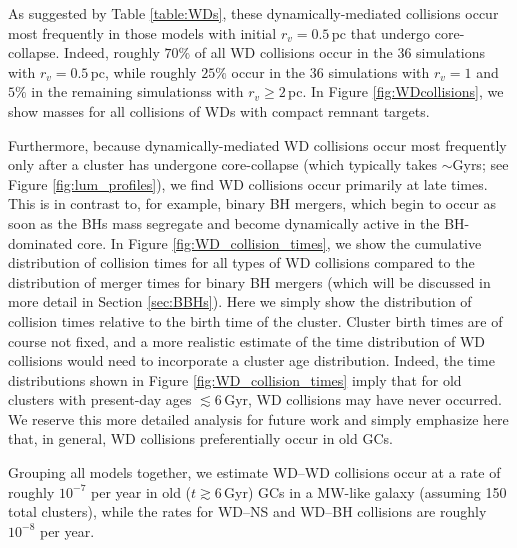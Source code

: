 \documentclass[twocolumn,tighten]{aastex63}
\begin{document}
As suggested by Table \ref{table:WDs}, these dynamically-mediated collisions occur most frequently in those models with initial $r_v=0.5\,$pc that undergo core-collapse. Indeed, roughly $70\%$ of all WD collisions occur in the 36 simulations with $r_v=0.5\,$pc, while roughly $25\%$ occur in the 36 simulations with $r_v=1$ and $5\%$ in the remaining simulationss with $r_v \geq 2\,$pc. In Figure \ref{fig:WDcollisions}, we show masses for all collisions of WDs with compact remnant targets.

Furthermore, because dynamically-mediated WD collisions occur most frequently only after a cluster has undergone core-collapse (which typically takes $\sim$Gyrs; see Figure \ref{fig:lum_profiles}), we find WD collisions occur primarily at late times. This is in contrast to, for example, binary BH mergers, which begin to occur as soon as the BHs mass segregate and become dynamically active in the BH-dominated core. In Figure \ref{fig:WD_collision_times}, we show the cumulative distribution of collision times for all types of WD collisions compared to the distribution of merger times for binary BH mergers (which will be discussed in more detail in Section \ref{sec:BBHs}). Here we simply show the distribution of collision times relative to the birth time of the cluster. Cluster birth times are of course not fixed, and a more realistic estimate of the time distribution of WD collisions would need to incorporate a cluster age distribution. Indeed, the time distributions shown in Figure \ref{fig:WD_collision_times} imply that for old clusters with present-day ages $\lesssim6\,$Gyr, WD collisions may have never occurred. We reserve this more detailed analysis for future work and simply emphasize here that, in general, WD collisions preferentially occur in old GCs.

Grouping all models together, we estimate WD--WD collisions occur at a rate of roughly $10^{-7}$ per year in old ($t\gtrsim6\,$Gyr) GCs in a MW-like galaxy (assuming 150 total clusters), while the rates for WD--NS and WD--BH collisions are roughly $10^{-8}$ per year.
\end{document}

